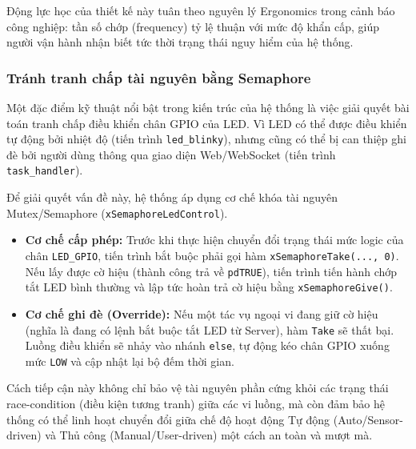 Động lực học của thiết kế này tuân theo nguyên lý Ergonomics trong cảnh báo công nghiệp: tần số chớp (frequency) tỷ lệ thuận với mức độ khẩn cấp, giúp người vận hành nhận biết tức thời trạng thái nguy hiểm của hệ thống.

\subsubsection{Tránh tranh chấp tài nguyên bằng Semaphore}
Một đặc điểm kỹ thuật nổi bật trong kiến trúc của hệ thống là việc giải quyết bài toán tranh chấp điều khiển chân GPIO của LED. Vì LED có thể được điều khiển tự động bởi nhiệt độ (tiến trình \texttt{led\_blinky}), nhưng cũng có thể bị can thiệp ghi đè bởi người dùng thông qua giao diện Web/WebSocket (tiến trình \texttt{task\_handler}).

Để giải quyết vấn đề này, hệ thống áp dụng cơ chế khóa tài nguyên Mutex/Semaphore (\texttt{xSemaphoreLedControl}). 
\begin{itemize}
    \item \textbf{Cơ chế cấp phép:} Trước khi thực hiện chuyển đổi trạng thái mức logic của chân \texttt{LED\_GPIO}, tiến trình bắt buộc phải gọi hàm \texttt{xSemaphoreTake(..., 0)}. Nếu lấy được cờ hiệu (thành công trả về \texttt{pdTRUE}), tiến trình tiến hành chớp tắt LED bình thường và lập tức hoàn trả cờ hiệu bằng \texttt{xSemaphoreGive()}.
    \item \textbf{Cơ chế ghi đè (Override):} Nếu một tác vụ ngoại vi đang giữ cờ hiệu (nghĩa là đang có lệnh bắt buộc tắt LED từ Server), hàm \texttt{Take} sẽ thất bại. Luồng điều khiển sẽ nhảy vào nhánh \texttt{else}, tự động kéo chân GPIO xuống mức \texttt{LOW} và cập nhật lại bộ đếm thời gian.
\end{itemize}

Cách tiếp cận này không chỉ bảo vệ tài nguyên phần cứng khỏi các trạng thái race-condition (điều kiện tương tranh) giữa các vi luồng, mà còn đảm bảo hệ thống có thể linh hoạt chuyển đổi giữa chế độ hoạt động Tự động (Auto/Sensor-driven) và Thủ công (Manual/User-driven) một cách an toàn và mượt mà.
